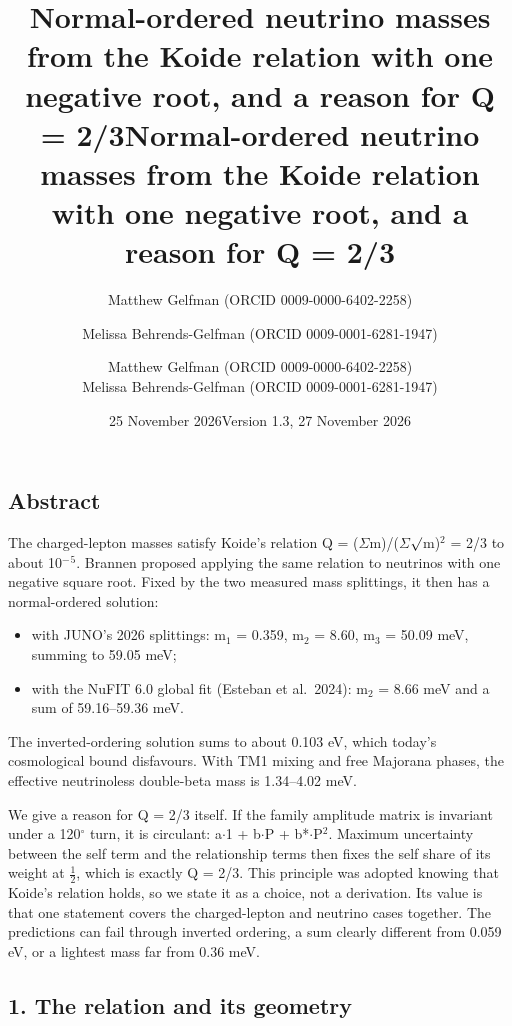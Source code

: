\documentclass[
  11pt,
]{article}
\title{Normal-ordered neutrino masses from the Koide relation with one
negative root, and a reason for Q = 2/3}
\author{Matthew Gelfman (ORCID 0009-0000-6402-2258) \and Melissa
Behrends-Gelfman (ORCID 0009-0001-6281-1947)}
\date{25 November 2026}
\title{Normal-ordered neutrino masses from the Koide relation with one negative
root, and a reason for Q = 2/3}
\author{Matthew Gelfman (ORCID 0009-0000-6402-2258) \\ Melissa Behrends-Gelfman (ORCID 0009-0001-6281-1947)}
\date{Version 1.3, 27 November 2026}
\providecommand{\tightlist}{%
  \setlength{\itemsep}{0pt}\setlength{\parskip}{0pt}}
\begin{document}
\maketitle
\hypertarget{abstract}{%
\subsection{Abstract}\label{abstract}}

The charged-lepton masses satisfy Koide's relation Q = (\ensuremath{\Sigma}m)/(\ensuremath{\Sigma}\ensuremath{\surd}m)\ensuremath{^{2}} = 2/3 to about 10\ensuremath{^{-}}\ensuremath{^{5}}. Brannen proposed applying the same relation to neutrinos with one negative square root. Fixed by the two measured mass splittings, it then has a normal-ordered solution:

\begin{itemize}
\tightlist
\item
  with JUNO's 2026 splittings: m\ensuremath{_{1}} = 0.359, m\ensuremath{_{2}} = 8.60, m\ensuremath{_{3}} = 50.09 meV, summing to 59.05 meV;
\item
  with the NuFIT 6.0 global fit (Esteban et al.~2024): m\ensuremath{_{2}} = 8.66 meV and a sum of 59.16--59.36 meV.
\end{itemize}

The inverted-ordering solution sums to about 0.103 eV, which today's cosmological bound disfavours. With TM1 mixing and free Majorana phases, the effective neutrinoless double-beta mass is 1.34--4.02 meV.

We give a reason for Q = 2/3 itself. If the family amplitude matrix is invariant under a 120\ensuremath{^\circ} turn, it is circulant: a\ensuremath{\cdot}1 + b\ensuremath{\cdot}P + b*\ensuremath{\cdot}P\ensuremath{^{2}}. Maximum uncertainty between the self term and the relationship terms then fixes the self share of its weight at \ensuremath{\frac{1}{2}}, which is exactly Q = 2/3. This principle was adopted knowing that Koide's relation holds, so we state it as a choice, not a derivation. Its value is that one statement covers the charged-lepton and neutrino cases together. The predictions can fail through inverted ordering, a sum clearly different from 0.059 eV, or a lightest mass far from 0.36 meV.

\hypertarget{the-relation-and-its-geometry}{%
\subsection{1. The relation and its geometry}\label{the-relation-and-its-geometry}}
\end{document}
